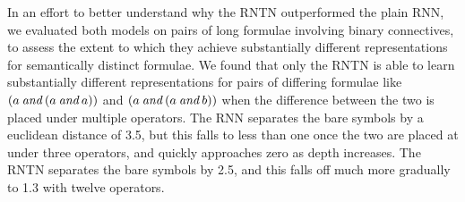 In an effort to better understand why the RNTN outperformed the plain
RNN, we evaluated both models on pairs of long formulae involving
binary connectives, to assess the extent to which they achieve
substantially different representations for semantically distinct
formulae. We found that only the RNTN is able to learn
substantially different representations for pairs of differing formulae like $(a \mathbin{\textit{and}} (a \mathbin{\textit{and}} a))$
 and $(a \mathbin{\textit{and}} (a \mathbin{\textit{and}} b))$ when the difference between the two is placed under multiple operators.
The RNN separates the bare symbols by a euclidean distance of 3.5, but this falls to less than one once the two are placed at under three operators, and quickly approaches zero as depth increases.
 The RNTN separates the bare symbols by 2.5, and this falls off much more gradually to 1.3 with twelve operators.





